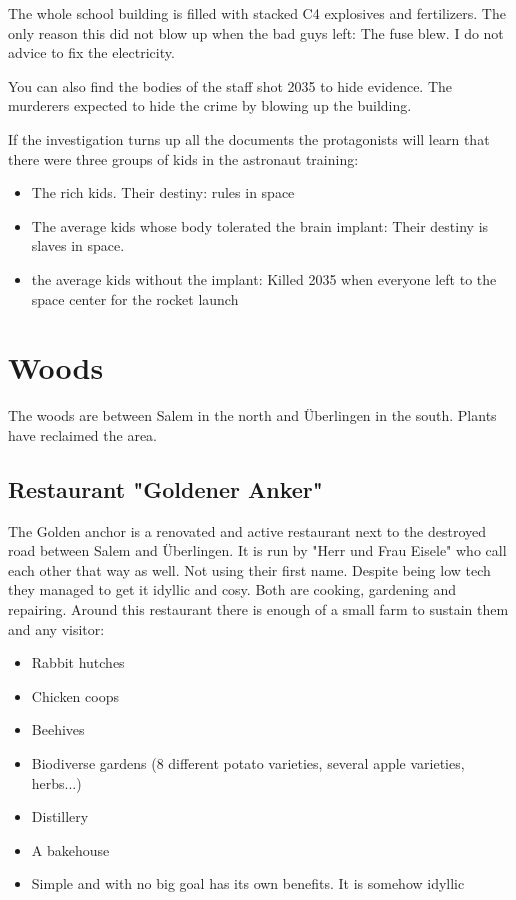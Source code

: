 The whole school building is filled with stacked C4 explosives and fertilizers. The only reason this did not blow up when the bad guys left: The fuse blew. I do not advice to fix the electricity.

You can also find the bodies of the staff shot 2035 to hide evidence. The murderers expected to hide the crime by blowing up the building.

If the investigation turns up all the documents the protagonists will learn that there were three groups of kids in the astronaut training:

\begin{itemize}
    \item The rich kids. Their destiny: rules in space
    \item The average kids whose body tolerated the brain implant: Their destiny is slaves in space.
    \item the average kids without the implant: Killed 2035 when everyone left to the space center for the rocket launch
\end{itemize}

\section{Woods}

The woods are between Salem in the north and Überlingen in the south. Plants have reclaimed the area.

\subsection{Restaurant "Goldener Anker"}

The Golden anchor is a renovated and active restaurant next to the destroyed road between Salem and Überlingen. It is run by "Herr und Frau Eisele" who call each other that way as well. Not using their first name. Despite being low tech they managed to get it idyllic and cosy. Both are cooking, gardening and repairing.
Around this restaurant there is enough of a small farm to sustain them and any visitor:

\begin{itemize}
    \item Rabbit hutches
    \item Chicken coops
    \item Beehives
    \item Biodiverse gardens (8 different potato varieties, several apple varieties, herbs...)
    \item Distillery
    \item A bakehouse
    \item Simple and with no big goal has its own benefits. It is somehow idyllic
\end{itemize}


